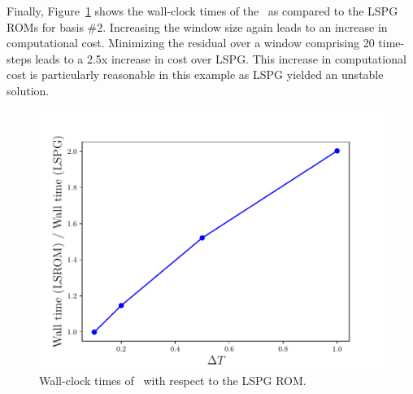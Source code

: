 Finally, Figure~\ref{fig:cav_wallclock} shows the wall-clock times of the \methodAcronymROMs\ as compared to the LSPG ROMs for basis \#2. Increasing the window size again leads to an increase in computational cost. Minimizing the residual over a window comprising 20 time-steps leads to a 2.5x increase in cost over LSPG. This increase in computational cost is particularly reasonable in this example as LSPG yielded an unstable solution. 
\begin{figure}
\begin{center}
\includegraphics[trim={0cm 0cm 0cm 0cm},clip,width=0.49\linewidth]{figs/cavity/walltime_vs_window_compare.pdf}
\caption{Wall-clock times of \methodAcronymROMs\ with respect to the LSPG ROM.}
\label{fig:cav_wallclock}
\end{center}
\end{figure}



